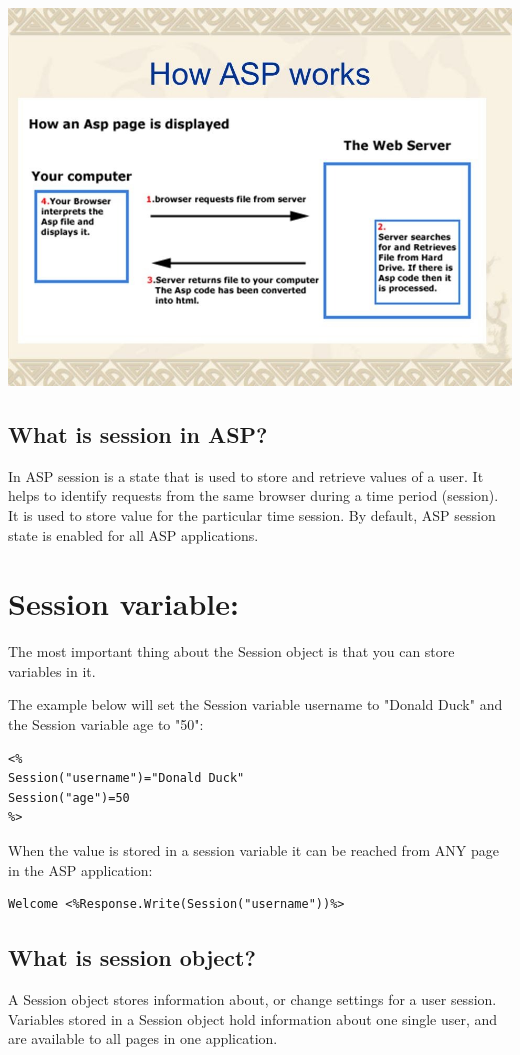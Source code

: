 \documentclass{article}
\begin{document}
\includegraphics[width=\textwidth]{WhatsApp Image 2023-01-12 at 08.23.16.jpeg}

\subsection{What is session in ASP?}
In ASP session is a state that is used to store and retrieve values of a user. It helps to identify requests from the same browser during a time period (session). It is used to store value for the particular time session. By default, ASP session state is enabled for all ASP applications.

\section{Session variable:}
The most important thing about the Session object is that you can store variables in it.

The example below will set the Session variable username to "Donald Duck" and the Session variable age to "50":

\begin{verbatim}
<%
Session("username")="Donald Duck"
Session("age")=50
%>
\end{verbatim}
When the value is stored in a session variable it can be reached from ANY page in the ASP application:

\begin{verbatim}
Welcome <%Response.Write(Session("username"))%>
\end{verbatim}

\subsection{What is session object?}
A Session object stores information about, or change settings for a user session.
Variables stored in a Session object hold information about one single user, and are available to all pages in one application.
\end{document}
